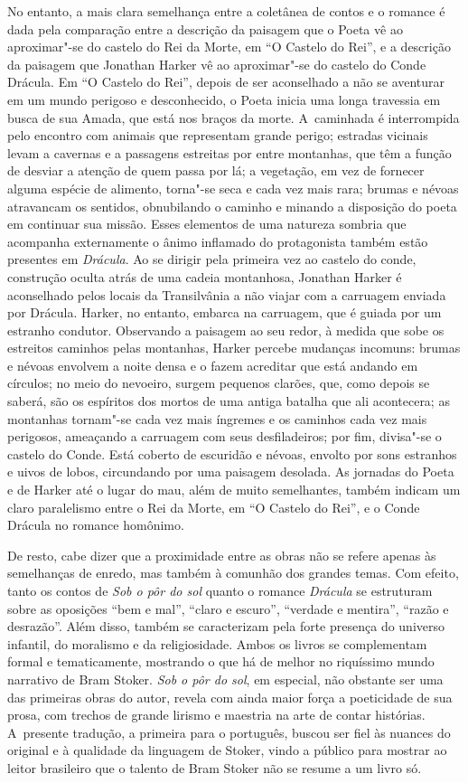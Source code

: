 No entanto, a mais clara semelhança entre a coletânea de contos e o
romance é dada pela comparação entre a descrição da paisagem que o Poeta
vê ao aproximar"-se do castelo do Rei da Morte, em ``O Castelo do Rei'',
e a descrição da paisagem que Jonathan Harker vê ao aproximar"-se do
castelo do Conde Drácula. Em ``O Castelo do Rei'', depois de ser
aconselhado a não se aventurar em um mundo perigoso e desconhecido, o
Poeta inicia uma longa travessia em busca de sua Amada, que está nos
braços da morte. A~caminhada é interrompida pelo encontro com animais
que representam grande perigo; estradas vicinais levam a cavernas e a
passagens estreitas por entre montanhas, que têm a função de desviar a
atenção de quem passa por lá; a vegetação, em vez de fornecer alguma
espécie de alimento, torna"-se seca e cada vez mais rara; brumas e névoas
atravancam os sentidos, obnubilando o caminho e minando a disposição do
poeta em continuar sua missão. Esses elementos de uma natureza sombria
que acompanha externamente o ânimo inflamado do protagonista também
estão presentes em \emph{Drácula}. Ao se dirigir pela primeira vez ao
castelo do conde, construção oculta atrás de uma cadeia montanhosa,
Jonathan Harker é aconselhado pelos locais da Transilvânia a não viajar
com a carruagem enviada por Drácula. Harker, no entanto, embarca na
carruagem, que é guiada por um estranho condutor. Observando a paisagem
ao seu redor, à medida que sobe os estreitos caminhos pelas montanhas,
Harker percebe mudanças incomuns: brumas e névoas envolvem a noite densa
e o fazem acreditar que está andando em círculos; no meio do nevoeiro,
surgem pequenos clarões, que, como depois se saberá, são os espíritos
dos mortos de uma antiga batalha que ali acontecera; as montanhas
tornam"-se cada vez mais íngremes e os caminhos cada vez mais perigosos,
ameaçando a carruagem com seus desfiladeiros; por fim, divisa"-se o
castelo do Conde. Está coberto de escuridão e névoas, envolto por sons
estranhos e uivos de lobos, circundando por uma paisagem desolada. As
jornadas do Poeta e de Harker até o lugar do mau, além de muito
semelhantes, também indicam um claro paralelismo entre o Rei da Morte,
em ``O Castelo do Rei'', e o Conde Drácula no romance homônimo.

De resto, cabe dizer que a proximidade entre as obras não se refere
apenas às semelhanças de enredo, mas também à comunhão dos grandes
temas. Com efeito, tanto os contos de \emph{Sob o pôr do sol} quanto o
romance \emph{Drácula} se estruturam sobre as oposições ``bem e mal'',
``claro e escuro'', ``verdade e mentira'', ``razão e desrazão''. Além
disso, também se caracterizam pela forte presença do universo infantil,
do moralismo e da religiosidade. Ambos os livros se complementam formal
e tematicamente, mostrando o que há de melhor no riquíssimo mundo
narrativo de Bram Stoker. \emph{Sob o pôr do sol}, em especial, não
obstante ser uma das primeiras obras do autor, revela com ainda maior
força a poeticidade de sua prosa, com trechos de grande lirismo e
maestria na arte de contar histórias. A~presente tradução, a primeira
para o português, buscou ser fiel às nuances do original e à
qualidade da linguagem de Stoker, vindo a público para mostrar ao leitor
brasileiro que o talento de Bram Stoker não se resume a um livro só.



